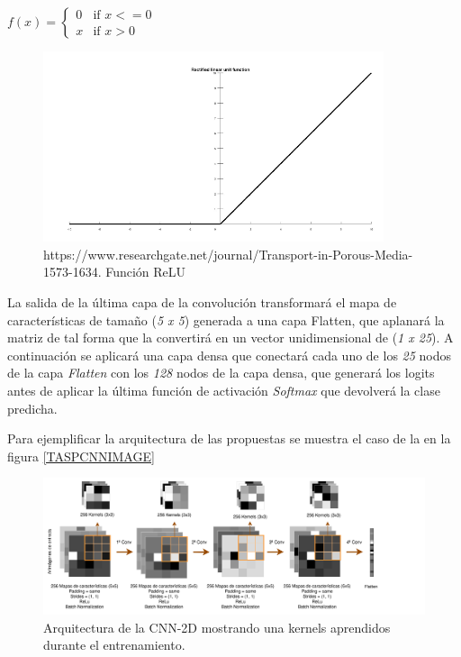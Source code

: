             \begin{center}
                $f(x) = \left\{
                               \begin{array}{lr}
                                 0 & \text{if } x<=0\\
                                 x & \text{if } x>0
                               \end{array}
                        \right.$
            \end{center}

            \begin{figure}[h]
                \centering
                \includegraphics[width=10cm]{archivos/4.Metodologia/Modelos/CNN/RELUImage}
                \caption{https://www.researchgate.net/journal/Transport-in-Porous-Media-1573-1634. Función ReLU}
                \label{RELUImage}
             \end{figure}

            La salida de la última capa de la convolución transformará el mapa de características de tamaño (\textit{5 x 5}) generada a una capa Flatten, que aplanará la matriz de tal forma que la convertirá en un vector unidimensional de (\textit{1 x 25}). A continuación se aplicará una capa densa que conectará cada uno de los \textit{25} nodos de la capa \textit{Flatten} con los \textit{128} nodos de la capa densa, que generará los logits antes de aplicar la última función de activación \textit{Softmax} que devolverá la clase predicha.


            Para ejemplificar la arquitectura de las  propuestas se muestra el caso de la  en la figura \eqref{TASPCNNIMAGE}


            \begin{figure}[h]
                \centering
                \includegraphics[width=17cm]{archivos/4.Metodologia/Modelos/CNN/2D/TASPCNN}
                \caption{Arquitectura de la CNN-2D mostrando una  kernels aprendidos durante el entrenamiento.}
                \label{TASPCNNIMAGE}
             \end{figure}


